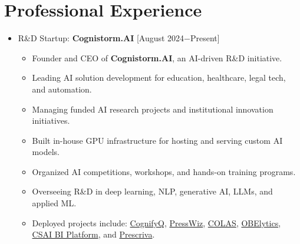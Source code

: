 \documentclass{article}
\begin{document}
\section{Professional Experience}
\begin{itemize}
\item R\&D Startup: \textbf{Cognistorm.AI} \hfill [August 2024$-$Present]
    \begin{itemize}
    \item Founder and CEO of \textbf{Cognistorm.AI}, an AI-driven R\&D initiative.
\item Leading AI solution development for education, healthcare, legal tech, and automation.
\item Managing funded AI research projects and institutional innovation initiatives.
\item Built in-house GPU infrastructure for hosting and serving custom AI models.
\item Organized AI competitions, workshops, and hands-on training programs.
\item Overseeing R\&D in deep learning, NLP, generative AI, LLMs, and applied ML.
    \item Deployed projects include: \href{https://cognifyq.cognistorm.ai/}{CognifyQ}, 
    \href{https://cognistorm.ai/presswiz}{PressWiz}, 
    \href{https://code.cognistorm.ai/}{COLAS}, 
    \href{https://obelytics.cognistorm.ai/}{OBElytics}, 
    \href{https://bi.cognistorm.ai/}{CSAI BI Platform}, and 
    \href{https://prescriva.cognistorm.ai/}{Prescriva}.
    \end{itemize}
\end{itemize}
\end{document}
